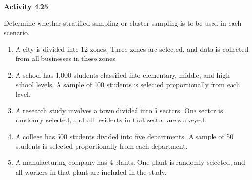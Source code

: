 \vspace{0.3ex}
\noindent\textbf{Activity 4.25}

\vspace{0.2ex}

Determine whether stratified sampling or cluster sampling is to be used in each scenario.

\begin{enumerate}
    \item A city is divided into 12 zones. Three zones are selected, and data is collected from all businesses in these zones.
    \item A school has 1,000 students classified into elementary, middle, and high school levels. A sample of 100 students is selected proportionally from each level.
    \item A research study involves a town divided into 5 sectors. One sector is randomly selected, and all residents in that sector are surveyed.
    \item A college has 500 students divided into five departments. A sample of 50 students is selected proportionally from each department.
    \item A manufacturing company has 4 plants. One plant is randomly selected, and all workers in that plant are included in the study.
\end{enumerate}
